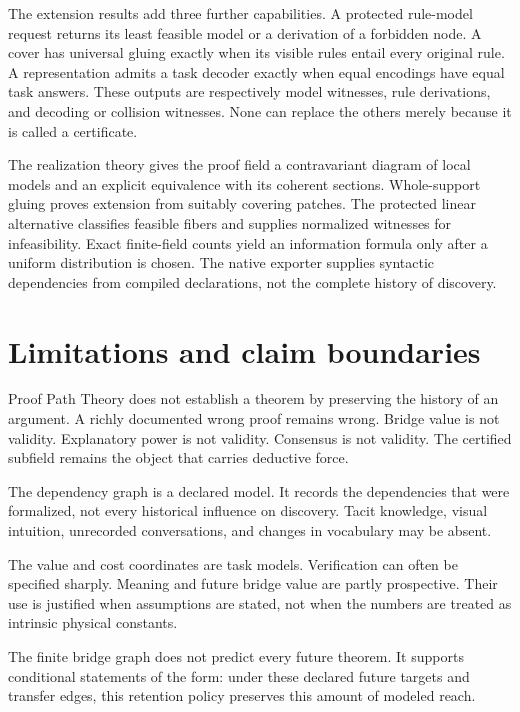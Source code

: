 The extension results add three further capabilities. A protected rule-model request returns its least feasible model or a derivation of a forbidden node. A cover has universal gluing exactly when its visible rules entail every original rule. A representation admits a task decoder exactly when equal encodings have equal task answers. These outputs are respectively model witnesses, rule derivations, and decoding or collision witnesses. None can replace the others merely because it is called a certificate.


\noindent The realization theory gives the proof field a contravariant diagram of local models and an explicit equivalence with its coherent sections. Whole-support gluing proves extension from suitably covering patches. The protected linear alternative classifies feasible fibers and supplies normalized witnesses for infeasibility. Exact finite-field counts yield an information formula only after a uniform distribution is chosen. The native exporter supplies syntactic dependencies from compiled declarations, not the complete history of discovery.


\section{Limitations and claim boundaries}
\label{PPT:sec:old27}

Proof Path Theory does not establish a theorem by preserving the history of an argument. A richly documented wrong proof remains wrong. Bridge value is not validity. Explanatory power is not validity. Consensus is not validity. The certified subfield remains the object that carries deductive force.

The dependency graph is a declared model. It records the dependencies that were formalized, not every historical influence on discovery. Tacit knowledge, visual intuition, unrecorded conversations, and changes in vocabulary may be absent.

The value and cost coordinates are task models. Verification can often be specified sharply. Meaning and future bridge value are partly prospective. Their use is justified when assumptions are stated, not when the numbers are treated as intrinsic physical constants.

The finite bridge graph does not predict every future theorem. It supports conditional statements of the form: under these declared future targets and transfer edges, this retention policy preserves this amount of modeled reach.

